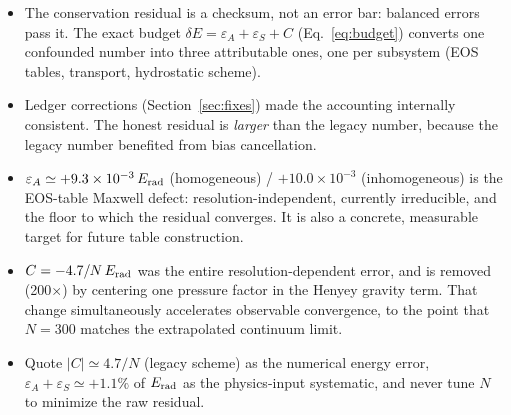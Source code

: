 \documentclass{aastex631}
\newcommand{\Erad}{E_{\rm rad}}
\newcommand{\epsA}{\varepsilon_A}
\newcommand{\epsS}{\varepsilon_S}
\newcommand{\dE}{\delta E}
\begin{document}
\begin{itemize}
\item The conservation residual is a checksum, not an error bar: balanced
errors pass it.  The exact budget $\dE = \epsA + \epsS + C$
(Eq.~\ref{eq:budget}) converts one confounded number into three
attributable ones, one per subsystem (EOS tables, transport, hydrostatic
scheme).
\item Ledger corrections (Section~\ref{sec:fixes}) made the accounting
internally consistent.  The honest residual is \emph{larger} than the
legacy number, because the legacy number benefited from bias cancellation.
\item $\epsA \simeq +9.3\times10^{-3}\,\Erad$ (homogeneous) /
$+10.0\times10^{-3}$ (inhomogeneous) is the EOS-table Maxwell defect:
resolution-independent, currently irreducible, and the floor to which the
residual converges.  It is also a concrete, measurable target for future
table construction.
\item $C = -4.7/N\,\Erad$ was the entire resolution-dependent error, and
is removed (200$\times$) by centering one pressure factor in the Henyey
gravity term.  That change simultaneously accelerates observable
convergence, to the point that $N=300$ matches the extrapolated continuum
limit.
\item Quote $|C|\simeq 4.7/N$ (legacy scheme) as the numerical energy
error, $\epsA + \epsS \simeq +1.1\%$ of $\Erad$ as the physics-input
systematic, and never tune $N$ to minimize the raw residual.
\end{itemize}
\end{document}
